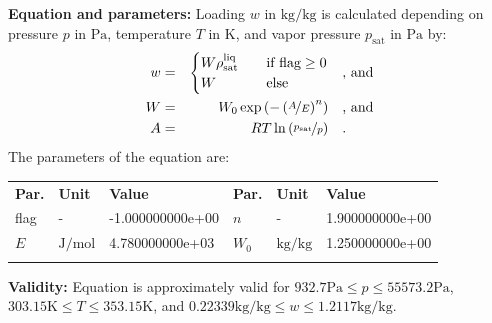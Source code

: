 \textbf{Equation and parameters:}
\newline
%
Loading $w$ in $\si{\kilogram\per\kilogram}$ is calculated depending on pressure $p$ in $\si{\pascal}$, temperature $T$ in $\si{\kelvin}$, and vapor pressure $p_\mathrm{sat}$ in $\si{\pascal}$ by:
%
\begin{equation*}
\begin{split}
w &=& \begin{cases} W \rho_\mathrm{sat}^{\mathrm{liq}} & \quad \text{if flag} \geq 0 \\ W & \quad \text{else} \end{cases} & \quad\text{, and} \\
W &=& W_0 \exp \left( - \left( \nicefrac{A}{E} \right) ^{n} \right) & \quad\text{, and} \\
A &=& R T \ln \left( \nicefrac{p_\mathrm{sat}}{p} \right) & \quad\text{.} \\
\end{split}
\end{equation*}
%
The parameters of the equation are:
%
\begin{longtable}[l]{lll|lll}
\toprule
\addlinespace
\textbf{Par.} & \textbf{Unit} & \textbf{Value} &	\textbf{Par.} & \textbf{Unit} & \textbf{Value} \\
\addlinespace
\midrule
\endhead

\bottomrule
\endfoot
\bottomrule
\endlastfoot
\addlinespace

flag & - & -1.000000000e+00 & $n$ & - & 1.900000000e+00 \\
$E$ & $\si{\joule\per\mole}$ & 4.780000000e+03 & $W_0$ & $\si{\kilogram\per\kilogram}$ & 1.250000000e+00 \\

\addlinespace\end{longtable}

\textbf{Validity:}
\newline
Equation is approximately valid for $932.7 \si{\pascal} \leq p \leq 55573.2 \si{\pascal}$,  $303.15 \si{\kelvin} \leq T \leq 353.15 \si{\kelvin}$, and $0.22339 \si{\kilogram\per\kilogram} \leq w \leq 1.2117 \si{\kilogram\per\kilogram}$.
\newline

